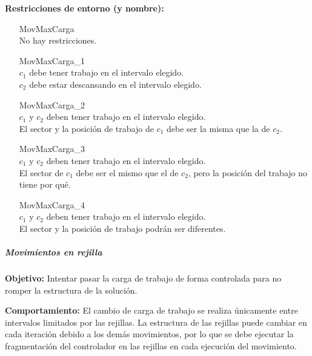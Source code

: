 \textbf{Restricciones de entorno (y nombre):}
\begin{enumerate}[align=parleft, labelsep=2cm, itemindent=5em, font=\itshape]
    \item[MovMaxCarga]\mbox{}\\No hay restricciones.

    \item[MovMaxCarga\_1]\mbox{}\\
    $c_1$ debe tener trabajo en el intervalo elegido. \\
    $c_2$ debe estar descansando en el intervalo elegido.

    \item[MovMaxCarga\_2]\mbox{}\\
    $c_1$ y $c_2$ deben tener trabajo en el intervalo elegido. \\
    El sector y la posición de trabajo de $c_1$ debe ser la misma que la de $c_2$.

    \item[MovMaxCarga\_3]\mbox{}\\
    $c_1$ y $c_2$ deben tener trabajo en el intervalo elegido. \\
    El sector de $c_1$ debe ser el mismo que el de $c_2$, pero la posición del trabajo no tiene por qué.

    \item[MovMaxCarga\_4]\mbox{}\\
    $c_1$ y $c_2$ deben tener trabajo en el intervalo elegido. \\
    El sector y la posición de trabajo podrán ser diferentes.
\end{enumerate}

\subparagraph{Movimientos en rejilla}
\label{entorno:movRejilla}

\textbf{Objetivo:} Intentar pasar la carga de trabajo de forma controlada para no romper la estructura de la solución.

\textbf{Comportamiento:} El cambio de carga de trabajo se realiza únicamente entre intervalos limitados por las rejillas. La estructura de las rejillas puede cambiar en cada iteración debido a los demás movimientos, por lo que se debe ejecutar la fragmentación del controlador en las rejillas en cada ejecución del movimiento.

